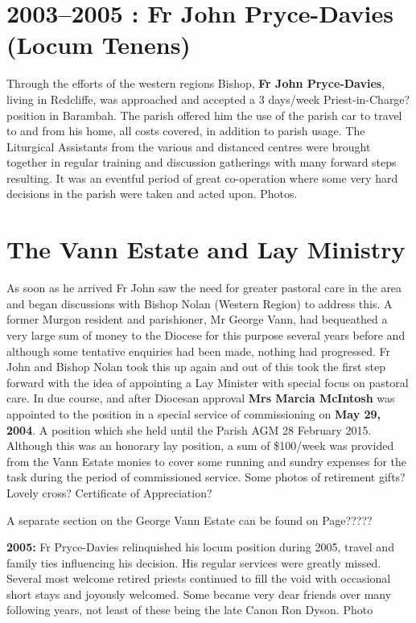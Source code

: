\hypertarget{fr-john-pryce-davies-locum-tenens}{%
\section{2003--2005 : Fr John Pryce-Davies (Locum
Tenens)}\label{fr-john-pryce-davies-locum-tenens}}

Through the efforts of the western regions Bishop, \textbf{Fr John
Pryce-Davies}, living in Redcliffe, was approached and accepted a 3
days/week Priest-in-Charge? position in Barambah. The parish offered him
the use of the parish car to travel to and from his home, all costs
covered, in addition to parish usage. The Liturgical Assistants from the
various and distanced centres were brought together in regular training
and discussion gatherings with many forward steps resulting. It was an
eventful period of great co-operation where some very hard decisions in
the parish were taken and acted upon. Photos.

\hypertarget{the-vann-estate-and-lay-ministry}{%
\section{The Vann Estate and Lay
Ministry}\label{the-vann-estate-and-lay-ministry}}

As soon as he arrived Fr John saw the need for greater pastoral care in
the area and began discussions with Bishop Nolan (Western Region) to
address this. A former Murgon resident and parishioner, Mr George Vann,
had bequeathed a very large sum of money to the Diocese for this purpose
several years before and although some tentative enquiries had been
made, nothing had progressed. Fr John and Bishop Nolan took this up
again and out of this took the first step forward with the idea of
appointing a Lay Minister with special focus on pastoral care. In due
course, and after Diocesan approval \textbf{Mrs Marcia McIntosh} was
appointed to the position in a special service of commissioning on
\textbf{May 29, 2004}. A position which she held until the Parish AGM 28
February 2015. Although this was an honorary lay position, a sum of
\$100/week was provided from the Vann Estate monies to cover some
running and sundry expenses for the task during the period of
commissioned service. Some photos of retirement gifts? Lovely cross?
Certificate of Appreciation?

A separate section on the George Vann Estate can be found on Page?????

\textbf{2005:} Fr Pryce-Davies relinquished his locum position during
2005, travel and family ties influencing his decision. His regular
services were greatly missed. Several most welcome retired priests
continued to fill the void with occasional short stays and joyously
welcomed. Some became very dear friends over many following years, not
least of these being the late Canon Ron Dyson. Photo

